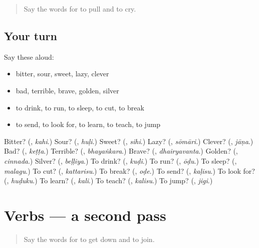 \begin{quote}
Say the words for to pull and to cry.
\end{quote}

\subsection*{Your turn}
Say these aloud:

\begin{itemize}
\raggedright
  \item bitter, sour, sweet, lazy, clever
  \item bad, terrible, brave, golden, silver
  \item to drink, to run, to sleep, to cut, to break
  \item to send, to look for, to learn, to teach, to jump
\end{itemize}

\begin{tcolorbox}[breakable,colback=teal!4,colframe=teal!35!black,title={Before you move on}]
Bitter? (\textbf{}, \emph{kahi}.) Sour? (\textbf{}, \emph{huḷi}.) Sweet? (\textbf{}, \emph{sihi}.) Lazy? (\textbf{}, \emph{sōmāri}.) Clever? (\textbf{}, \emph{jāṇa}.) Bad? (\textbf{}, \emph{keṭṭa}.) Terrible? (\textbf{}, \emph{bhayaṅkara}.) Brave? (\textbf{}, \emph{dhairyavanta}.) Golden? (\textbf{}, \emph{cinnada}.) Silver? (\textbf{}, \emph{beḷḷiya}.) To drink? (\textbf{}, \emph{kuḍi}.) To run? (\textbf{}, \emph{ōḍu}.) To sleep? (\textbf{}, \emph{malagu}.) To cut? (\textbf{}, \emph{kattarisu}.) To break? (\textbf{}, \emph{oḍe}.) To send? (\textbf{}, \emph{kaḷisu}.) To look for? (\textbf{}, \emph{huḍuku}.) To learn? (\textbf{}, \emph{kali}.) To teach? (\textbf{}, \emph{kalisu}.) To jump? (\textbf{}, \emph{jigi}.)
\end{tcolorbox}
\section[(dialogue)]{Verbs — a second pass}

\label{lesson:KA-R153-second-pass-verbs}



\begin{quote}
Say the words for to get down and to join.
\end{quote}

